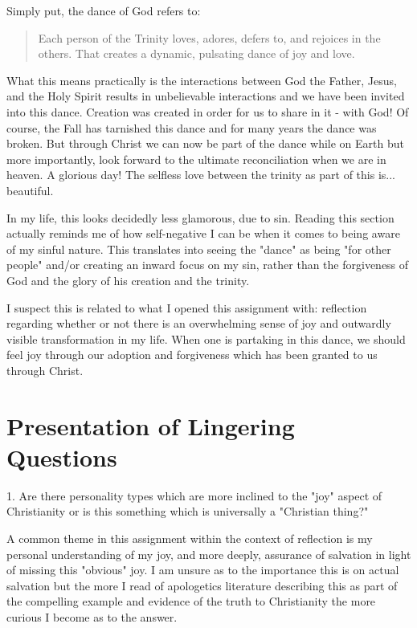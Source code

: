 \documentclass[12pt]{turabian-researchpaper}
\begin{document}
Simply put, the dance of God refers to:\autocite[pg.224]{keller2008reason}

\begin{quotation}
Each person of the Trinity loves, adores, defers to, and rejoices in the others. That creates a dynamic, pulsating dance of joy and love.
\end{quotation}

What this means practically is the interactions between God the Father, Jesus, and the Holy Spirit results in unbelievable interactions and we have been invited into this dance. Creation was created in order for us to share in it - with God! Of course, the Fall has tarnished this dance and for many years the dance was broken. But through Christ we can now be part of the dance while on Earth but more importantly, look forward to the ultimate reconciliation when we are in heaven. A glorious day! The selfless love between the trinity as part of this is... beautiful.

In my life, this looks decidedly less glamorous, due to sin. Reading this section actually reminds me of how self-negative I can be when it comes to being aware of my sinful nature. This translates into seeing the "dance" as being "for other people" and/or creating an inward focus on my sin, rather than the forgiveness of God and the glory of his creation and the trinity.

I suspect this is related to what I opened this assignment with: reflection regarding whether or not there is an overwhelming sense of joy and outwardly visible transformation in my life. When one is partaking in this dance, we should feel joy through our adoption and forgiveness which has been granted to us through Christ.

\section{Presentation of Lingering Questions}

1. Are there personality types which are more inclined to the "joy" aspect of Christianity or is this something which is universally a "Christian thing?"

A common theme in this assignment within the context of reflection is my personal understanding of my joy, and more deeply, assurance of salvation in light of missing this "obvious" joy. I am unsure as to the importance this is on actual salvation but the more I read of apologetics literature describing this as part of the compelling example and evidence of the truth to Christianity the more curious I become as to the answer.
\end{document}
